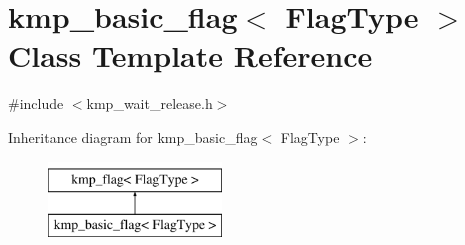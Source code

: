 \hypertarget{classkmp__basic__flag}{\section{kmp\-\_\-basic\-\_\-flag$<$ Flag\-Type $>$ Class Template Reference}
\label{classkmp__basic__flag}
}


{\ttfamily \#include $<$kmp\-\_\-wait\-\_\-release.\-h$>$}

Inheritance diagram for kmp\-\_\-basic\-\_\-flag$<$ Flag\-Type $>$\-:\begin{figure}[H]
\begin{center}
\leavevmode
\includegraphics[height=2.000000cm]{classkmp__basic__flag}
\end{center}
\end{figure}
